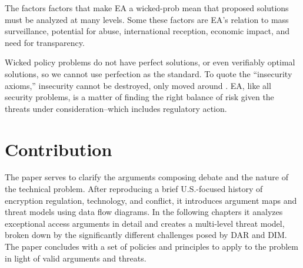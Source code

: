  The factors factors that make \ac{EA} a \ac{wicked-prob} mean that
proposed solutions must be analyzed at many levels. Some these factors are \ac{EA}'s relation to mass surveillance,
potential for abuse, international reception, economic impact, and need for transparency.

 Wicked policy problems do not have perfect solutions, or even verifiably
optimal solutions, so we cannot use perfection as the standard. To quote the ``insecurity axioms,'' insecurity cannot be
destroyed, only moved around \cite{nrc_schneider_1999}. \Ac{EA}, like all security problems, is a matter of finding the
right balance of risk given the threats under consideration--which includes regulatory action.

\principlesend


\section{Contribution}
\label{sec-contribution}

The paper serves to clarify the arguments composing debate and the nature of the technical problem. After reproducing a
brief U.S.-focused history of encryption regulation, technology, and conflict, it introduces argument maps and threat
models using data flow diagrams. In the following chapters it analyzes exceptional access arguments in detail and
creates a multi-level threat model, broken down by the significantly different challenges posed by \acl{DAR} and
\acl{DIM}. The paper concludes with a set of policies and principles to apply to the problem in light of valid arguments
and threats.
